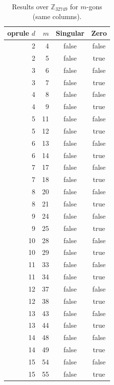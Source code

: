 \begin{table}[htbp]
    \centering
    \caption{Results over $\mathbb{Z}_{32749}$ for $m$-gons (same columns).}
    \label{tab:mgon-results_Z32749}
    \small
    \begin{tabular}{r r c c}
        	oprule
        $d$ & $m$ & Singular & Zero \\
        \midrule
        2  & 4  & false & false \\
        2  & 5  & false & true  \\
        3  & 6  & false & false \\
        3  & 7  & false & true  \\
        4  & 8  & false & false \\
        4  & 9  & false & true  \\
        5  & 11 & false & false \\
        5  & 12 & false & true  \\
        6  & 13 & false & false \\
        6  & 14 & false & true  \\
        7  & 17 & false & false \\
        7  & 18 & false & true  \\
        8  & 20 & false & false \\
        8  & 21 & false & true  \\
        9  & 24 & false & false \\
        9  & 25 & false & true  \\
        10 & 28 & false & false \\
        10 & 29 & false & true  \\
        11 & 33 & false & false \\
        11 & 34 & false & true  \\
        12 & 37 & false & false \\
        12 & 38 & false & true  \\
        13 & 43 & false & false \\
        13 & 44 & false & true  \\
        14 & 48 & false & false \\
        14 & 49 & false & true  \\
        15 & 54 & false & false \\
        15 & 55 & false & true  \\
        \bottomrule
    \end{tabular}
\end{table}


